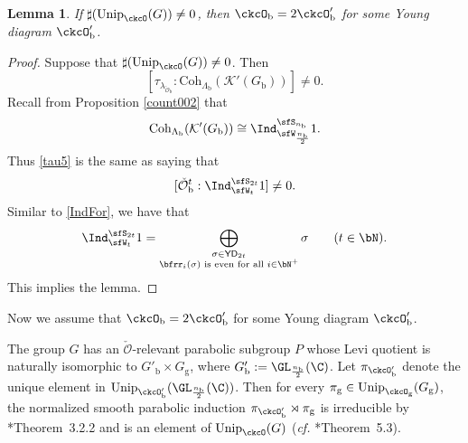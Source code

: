 \documentclass[12pt]{amsart}
\newcommand{\trivial}[2][]{\if\relax\detokenize{#1}\relax
  {%
      \color{orange} \vspace{0em}$[$#2$]$
      \color{black}
  }
  \else
\ifx#1h
\ifcsname showtrivial\endcsname
{%
    \color{orange}\vspace{0em}$[$#2$]$
    \color{black}
}
\fi
\else {\red Wrong argument!} \fi
\fi
}
\newcommand{\CK}{{\mathcal {K}}}
\newcommand{\CO}{{\mathcal {O}}}
\newcommand{\be}{\begin {equation}}
\newcommand{\ee}{\end {equation}}
\numberwithin{equation}{section}
\newtheorem{lem}[thm]{Lemma}
\theoremstyle{remark}
\def\half{{\tfrac{1}{2}}}
\def\cf{\emph{cf.} }
\def\Unip{\mathrm{Unip}}
\def\YD{\mathsf{YD}}
\def\nbb{n_{\mathrm b}}
\def\Coh{\mathrm{Coh}}
\def\ckcOb{\ckcO_{\mathrm b}}
\def\ckcOpb{\ckcO'_{\mathrm b}}
\def\Gg{G_{\mathrm g}}
\newcommand{\Lam}{{[\lambda]}}
\begin{document}




\begin{lem}\label{thmca0000}
  If  $ \sharp(\Unip_{\ckcO}(G))\neq 0$, then
  $
    \ckcOb= 2\ckcOpb
  $
  for some Young diagram $\ckcOpb$.

\end{lem}
\begin{proof}
Suppose that  $ \sharp(\Unip_{\ckcO}(G))\neq 0$. Then
\be\label{tau5}
   [\tau_{\lambda_{\check \CO_\mathrm b}}: \Coh_{\Lambda_{\mathrm b}}(\CK'(G_\mathrm b))]\neq 0.
\ee
Recall from Proposition \ref{count002} that
  \[
       \Coh_{\Lambda_\mathrm b}(\CK'(G_\mathrm b)) \cong  \Ind_{\sfW_{\frac{n_{\mathrm b}}{2}}}^{\sfS_{n_{\mathrm b}}} 1.
    \]
Thus \eqref{tau5}
 is the same as saying that
\[
 [ {\check \CO_\mathrm b}^t: \Ind_{\sfW_{t}}^{\sfS_{2t}} 1 ]\neq 0.
\]
Similar to \eqref{IndFor}, we have that
\begin{equation}\label{IndFor3}
  \Ind_{\sfW_{t}}^{\sfS_{2t}} 1= \bigoplus_{\substack{\sigma\in \YD_{2t}\\
      \bfrr_{i}(\sigma) \text{ is even for all }i\in \bN^+}} \sigma\qquad (t\in \bN).
\end{equation}
This implies the lemma.
\end{proof}

Now we assume that $
    \ckcOb= 2\ckcOpb
  $
  for some Young diagram $\ckcOpb$.

The group $G$ has an $\check \CO$-relevant parabolic subgroup $P$ whose Levi quotient  is naturally isomorphic to $G'_{\mathrm b}\times G_{\mathrm g}$, where
$G'_{\mathrm b}:=\GL_{\frac{n_{\mathrm b}}{2}}(\C)$. Let $\pi_{\ckcOpb}$ denote the
unique element in $\Unip_{\ckcOpb}(\GL_{\frac{n_{\mathrm b}}{2}}(\C))$. Then for
every $\pi_\mathrm g\in \Unip_{\ckcO_{\mathrm g}}(\Gg)$, the normalized smooth parabolic
induction $\pi_{\ckcOpb}\rtimes \pi_{\mathrm g}$ is irreducible by
\cite{Mat96}*{Theorem~3.2.2} and is an element of $\Unip_{\ckcO}(G)$ (\cf
\cite{MR.U}*{Theorem~5.3}).
\end{document}
